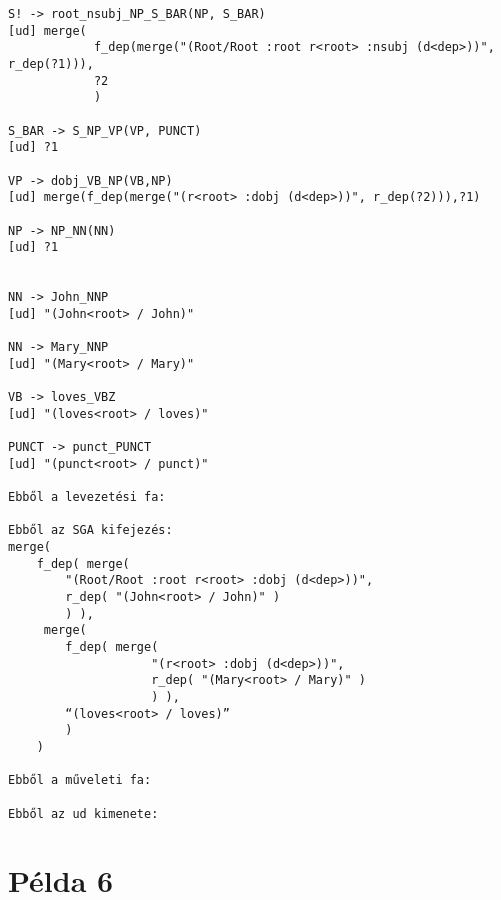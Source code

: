 \begin{verbatim}
S! -> root_nsubj_NP_S_BAR(NP, S_BAR)
[ud] merge(
			f_dep(merge("(Root/Root :root r<root> :nsubj (d<dep>))", r_dep(?1))),
	 		?2
	 		)

S_BAR -> S_NP_VP(VP, PUNCT)
[ud] ?1

VP -> dobj_VB_NP(VB,NP)
[ud] merge(f_dep(merge("(r<root> :dobj (d<dep>))", r_dep(?2))),?1)

NP -> NP_NN(NN)
[ud] ?1


NN -> John_NNP
[ud] "(John<root> / John)"

NN -> Mary_NNP
[ud] "(Mary<root> / Mary)"

VB -> loves_VBZ
[ud] "(loves<root> / loves)"

PUNCT -> punct_PUNCT
[ud] "(punct<root> / punct)"

Ebből a levezetési fa:

Ebből az SGA kifejezés:
merge(
	f_dep( merge(
		"(Root/Root :root r<root> :dobj (d<dep>))",
 		r_dep( "(John<root> / John)" )
		) ),
	 merge(
		f_dep( merge(
					"(r<root> :dobj (d<dep>))", 
					r_dep( "(Mary<root> / Mary)" )
					) ),
 		“(loves<root> / loves)”
		)
	)

Ebből a műveleti fa:

Ebből az ud kimenete:

\end{verbatim}



\section{Példa 6}

